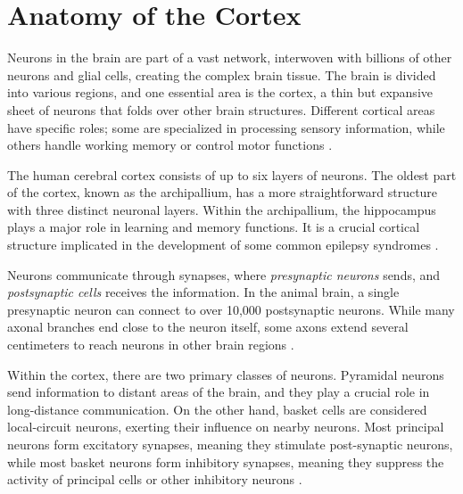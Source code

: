 \documentclass[a4paper, UKenglish, 11pt]{uiomaster}
\begin{document}
\section{Anatomy of the Cortex}
Neurons in the brain are part of a vast network, interwoven with billions of other neurons and glial cells, creating the complex brain tissue. The brain is divided into various regions, and one essential area is the cortex, a thin but expansive sheet of neurons that folds over other brain structures. Different cortical areas have specific roles; some are specialized in processing sensory information, while others handle working memory or control motor functions \cite{gerstner2014neuronal}.

The human cerebral cortex consists of up to six layers of neurons. The oldest part of the cortex, known as the archipallium, has a more straightforward structure with three distinct neuronal layers. Within the archipallium, the hippocampus plays a major role in learning and memory functions. It is a crucial cortical structure implicated in the development of some common epilepsy syndromes \cite{bromfield2006introduction}.

Neurons communicate through synapses, where \emph{presynaptic neurons} sends, and \emph{postsynaptic cells} receives the information. In the animal brain, a single presynaptic neuron can connect to over 10,000 postsynaptic neurons. While many axonal branches end close to the neuron itself, some axons extend several centimeters to reach neurons in other brain regions \cite{gerstner2014neuronal}.

Within the cortex, there are two primary classes of neurons. Pyramidal neurons send information to distant areas of the brain, and they play a crucial role in long-distance communication. On the other hand, basket cells are considered local-circuit neurons, exerting their influence on nearby neurons. Most principal neurons form excitatory synapses, meaning they stimulate post-synaptic neurons, while most basket neurons form inhibitory synapses, meaning they suppress the activity of principal cells or other inhibitory neurons \cite{bromfield2006introduction}.


%
%
%
\end{document}
